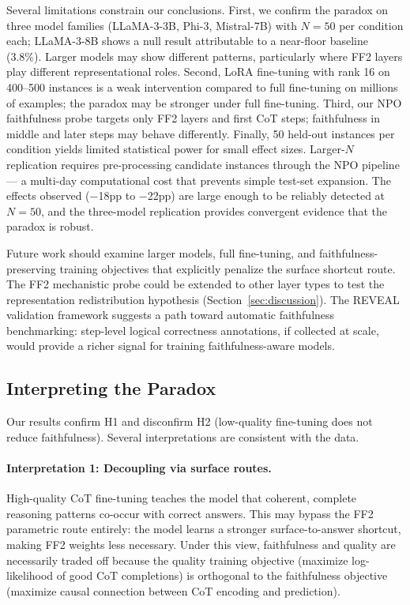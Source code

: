 \documentclass[11pt]{article}
\begin{document}
Several limitations constrain our conclusions. First, we confirm the paradox
on three model families (LLaMA-3-3B, Phi-3, Mistral-7B) with $N = 50$ per
condition each; LLaMA-3-8B shows a null result attributable to a near-floor
baseline (3.8\%). Larger models may show different patterns, particularly
where FF2 layers play different representational roles. Second, LoRA fine-tuning
with rank 16 on 400--500 instances is a weak intervention compared to full
fine-tuning on millions of examples; the paradox may be stronger under full
fine-tuning. Third, our NPO faithfulness probe targets only FF2 layers and
first CoT steps; faithfulness in middle and later steps may behave differently.
Finally, 50 held-out instances per condition yields limited statistical power
for small effect sizes. Larger-$N$ replication requires pre-processing
candidate instances through the NPO pipeline --- a multi-day computational
cost that prevents simple test-set expansion. The effects observed
($-$18pp to $-$22pp) are large enough to be reliably detected at $N{=}50$,
and the three-model replication provides convergent evidence that the paradox
is robust.

Future work should examine larger models, full fine-tuning, and
faithfulness-preserving training objectives that explicitly penalize the surface
shortcut route. The FF2 mechanistic probe could be extended to other layer types
to test the representation redistribution hypothesis
(Section~\ref{sec:discussion}). The REVEAL validation framework suggests a path
toward automatic faithfulness benchmarking: step-level logical correctness
annotations, if collected at scale, would provide a richer signal for training
faithfulness-aware models.

\subsection{Interpreting the Paradox}

Our results confirm H1 and disconfirm H2 (low-quality fine-tuning does not
reduce faithfulness). Several interpretations are consistent with the data.

\paragraph{Interpretation 1: Decoupling via surface routes.}
High-quality CoT fine-tuning teaches the model that coherent, complete
reasoning patterns co-occur with correct answers. This may bypass the FF2
parametric route entirely: the model learns a stronger surface-to-answer
shortcut, making FF2 weights less necessary. Under this view, faithfulness and
quality are necessarily traded off because the quality training objective
(maximize log-likelihood of good CoT completions) is orthogonal to the
faithfulness objective (maximize causal connection between CoT encoding and
prediction).
\end{document}
